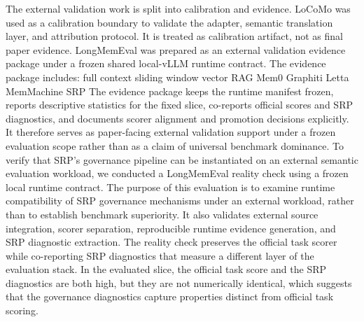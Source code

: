 {}
\markdownRendererSectionEnd \markdownRendererSectionBegin
{}\markdownRendererInterblockSeparator
{}The external validation work is split into calibration and evidence.\markdownRendererParagraphSeparator
{}LoCoMo was used as a calibration boundary to validate the adapter, semantic translation layer, and attribution protocol. It is treated as calibration artifact, not as final paper evidence.\markdownRendererParagraphSeparator
{}LongMemEval was prepared as an external validation evidence package under a frozen shared local-vLLM runtime contract. The evidence package includes:\markdownRendererInterblockSeparator
{}\markdownRendererUlBeginTight
\markdownRendererUlItem full context\markdownRendererUlItemEnd 
\markdownRendererUlItem sliding window\markdownRendererUlItemEnd 
\markdownRendererUlItem vector RAG\markdownRendererUlItemEnd 
\markdownRendererUlItem Mem0\markdownRendererUlItemEnd 
\markdownRendererUlItem Graphiti\markdownRendererUlItemEnd 
\markdownRendererUlItem Letta\markdownRendererUlItemEnd 
\markdownRendererUlItem MemMachine\markdownRendererUlItemEnd 
\markdownRendererUlItem SRP\markdownRendererUlItemEnd 
\markdownRendererUlEndTight \markdownRendererInterblockSeparator
{}The evidence package keeps the runtime manifest frozen, reports descriptive statistics for the fixed slice, co-reports official scores and SRP diagnostics, and documents scorer alignment and promotion decisions explicitly. It therefore serves as paper-facing external validation support under a frozen evaluation scope rather than as a claim of universal benchmark dominance.\markdownRendererInterblockSeparator
{}\markdownRendererSectionBegin
{}\markdownRendererInterblockSeparator
{}To verify that SRP's governance pipeline can be instantiated on an external semantic evaluation workload, we conducted a LongMemEval reality check using a frozen local runtime contract. The purpose of this evaluation is to examine runtime compatibility of SRP governance mechanisms under an external workload, rather than to establish benchmark superiority. It also validates external source integration, scorer separation, reproducible runtime evidence generation, and SRP diagnostic extraction.\markdownRendererParagraphSeparator
{}The reality check preserves the official task scorer while co-reporting SRP diagnostics that measure a different layer of the evaluation stack. In the evaluated slice, the official task score and the SRP diagnostics are both high, but they are not numerically identical, which suggests that the governance diagnostics capture properties distinct from official task scoring.\markdownRendererInterblockSeparator
